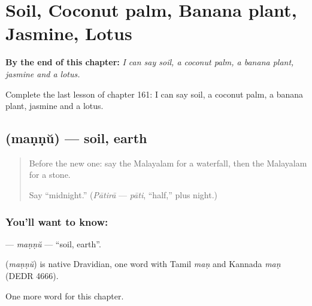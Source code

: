 
\chapter{Soil, Coconut palm, Banana plant, Jasmine, Lotus}
\label{ch:ml-soil-coconut-palm-banana-plant-jasmine-lotus}

\begin{chapteropening}
\textbf{By the end of this chapter:} \emph{I can say soil, a coconut palm, a banana plant, jasmine and a lotus.}

Complete the last lesson of chapter 161: I can say soil, a coconut palm, a banana plant, jasmine and a lotus.
\end{chapteropening}

\section[\texorpdfstring{\ml{മണ്ണ്} (maṇṇŭ)}{മണ്ണ് (maṇṇŭ)}]{ (maṇṇŭ) — soil, earth}

\label{lesson:ML-C161-mannu}



\begin{quote}
Before the new one: say the Malayalam for a waterfall, then the Malayalam for a stone.

Say \textquotedblleft{}midnight.\textquotedblright{} (\emph{Pātirā} — \emph{pāti}, \textquotedblleft{}half,\textquotedblright{} plus night.)
\end{quote}

\subsection*{You'll want to know: }
\textbf{} — \emph{maṇṇŭ} — \textquotedblleft{}soil, earth\textquotedblright{}.

\begin{cousinweb}
\textbf{} (\emph{maṇṇŭ}) is native Dravidian, one word with Tamil \emph{maṇ} and Kannada \emph{maṇ} (DEDR 4666).
\end{cousinweb}

\begin{grammarlens}[title={What you've built}]
One more word for this chapter.
\end{grammarlens}

